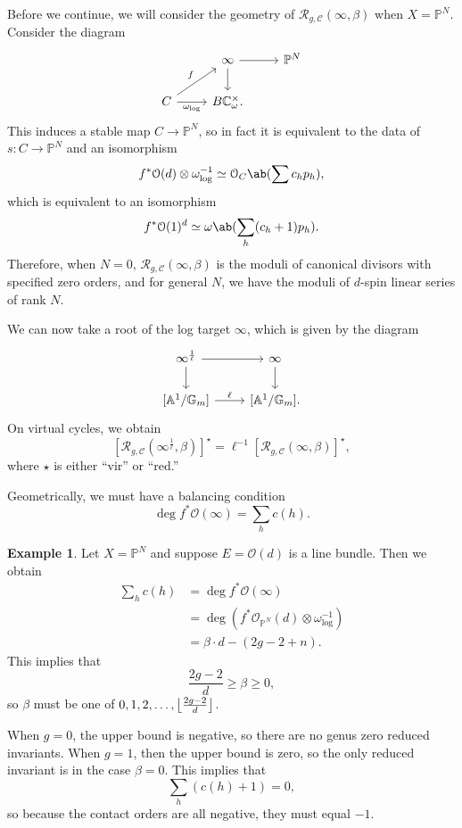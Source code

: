 \documentclass[10pt]{amsart}
\DeclarePairedDelimiter{\floor}{\lfloor}{\rfloor}
\theoremstyle{definition}
\newtheorem{exm}[thm]{Example}
\theoremstyle{remark}
\theoremstyle{plain}
\theoremstyle{definition}
\theoremstyle{remark}
\newcommand{\A}{\mathbb{A}}
\newcommand{\G}{\mathbb{G}}
\newcommand{\C}{\mathbb{C}}
\renewcommand{\P}{\mathbb{P}}
\newcommand{\mc}[1]{\mathcal{#1}}
\newcommand{\1}{\mathbf{1}}
\newcommand{\2}{\mathbf{2}}
\newcommand{\3}{\mathbf{3}}
\begin{document}
Before we continue, we will consider the geometry of $\mc{R}_{g, \mc{C}}(\infty, \beta)$ when $X = \P^N$. Consider the diagram
\begin{equation*}
\begin{tikzcd}
    & \infty \ar{r} \ar{d} & \P^N \\
    C \ar{ur}{f} \ar[swap]{r}{\omega_{\log}} & B \C_{\omega}^{\times}.
\end{tikzcd}
\end{equation*}
This induces a stable map $C \to \P^N$, so in fact it is equivalent to the data of $s \colon C \to \P^N$ and an isomorphism
\[ f^* \mc{O}(d) \otimes \omega_{\log}^{-1} \simeq \mc{O}_C\ab(\sum c_h p_h), \]
which is equivalent to an isomorphism
\[ f^* \mc{O}(1)^d \simeq \omega \ab(\sum_h (c_h+1)p_h). \]
Therefore, when $N = 0$, $\mc{R}_{g,\mc{C}}(\infty, \beta)$ is the moduli of canonical divisors with specified zero orders, and for general $N$, we have the moduli of $d$-spin linear series of rank $N$.

We can now take a root of the log target $\infty$, which is given by the diagram
\begin{equation*}
\begin{tikzcd}
    \infty^{\frac{1}{\ell}} \ar{r} \ar{d} & \infty \ar{d} \\
    {[\A^1/\G_m]} \ar{r}{\ell} & {[\A^1/\G_m]}.
\end{tikzcd}
\end{equation*}
On virtual cycles, we obtain
\[ [\mc{R}_{g, \mc{C}}(\infty^{\frac{1}{\ell}}, \beta)]^{\star} = \ell^{-1} [\mc{R}_{g, \mc{C}}(\infty, \beta)]^{\star}, \]
where $\star$ is either ``vir'' or ``red.''

Geometrically, we must have a balancing condition
\[ \deg f^* \mc{O}(\infty) = \sum_h c(h). \]

\begin{exm}
    Let $X = \P^N$ and suppose $E = \mc{O}(d)$ is a line bundle. Then we obtain
    \begin{align*}
        \sum_h c(h) &= \deg f^* \mc{O}(\infty) \\
        &= \deg (f^* \mc{O}_{\P^N}(d)\otimes \omega_{\log}^{-1}) \\
        &= \beta \cdot d - (2g-2+n).
    \end{align*}
    This implies that
    \[ \frac{2g-2}{d} \geq \beta \geq 0, \]
    so $\beta$ must be one of $0,1,2,\ldots,\floor*{\frac{2g-2}{d}}$.

    When $g=0$, the upper bound is negative, so there are no genus zero reduced invariants. When $g=1$, then the upper bound is zero, so the only reduced invariant is in the case $\beta = 0$. This implies that
    \[ \sum_h (c(h)+1) = 0, \]
    so because the contact orders are all negative, they must equal $-1$.
\end{exm}
\end{document}
